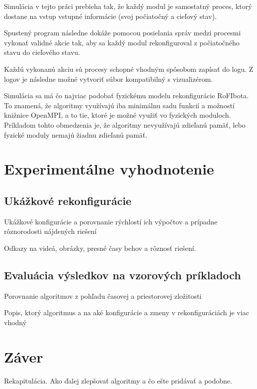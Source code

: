 \documentclass[
  digital, %
  oneside, %
  table,   %
  lof,     %
  nolot,     %
]{fithesis3}
\begin{document}
Simulácia v tejto práci prebieha tak, že každý modul je samostatný proces, ktorý dostane na vstup vstupné informácie (svoj počiatočný a cieľový stav). 

Spustený program následne dokáže pomocou posielania správ medzi procesmi vykonať validné akcie tak, aby sa každý modul rekonfiguroval z počiatočného stavu do cieľového stavu. 

Každú vykonanú akciu sú procesy schopné vhodným spôsobom zapísať do logu. Z logov je následne možné vytvoriť súbor kompatibilný s vizualizérom. 

Simulácia sa má čo najviac podobať fyzickému modelu rekonfigurácie RoFIbota. To znamená, že algoritmy využívajú iba minimálnu sadu funkcií a možností knižnice OpenMPI, a to tie, ktoré je možné využiť vo fyzických moduloch. Príkladom tohto obmedzenia je, že algoritmy nevyužívajú zdieľanú pamäť, lebo fyzické moduly nemajú žiadnu zdieľanú pamäť. 





\chapter{Experimentálne vyhodnotenie}
\section{Ukážkové rekonfigurácie}
Ukážkové konfigurácie a porovnanie rýchlostí ich výpočtov a prípadne rôznorodosti nájdených riešení

Odkazy na videá, obrázky, presné časy behov a rôznosť riešení. 
\section{Evaluácia výsledkov na vzorových príkladoch}
Porovnanie algoritmov z pohľadu časovej a priestorovej zložitosti

Popis, ktorý algoritmus a na aké konfigurácie a zmeny v rekonfiguráciách je viac vhodný



\chapter{Záver}
Rekapitulácia. 
Ako ďalej zlepšovať algoritmy a čo ešte pridávať a podobne. 

\printbibliography[heading=bibintoc] %
\end{document}
